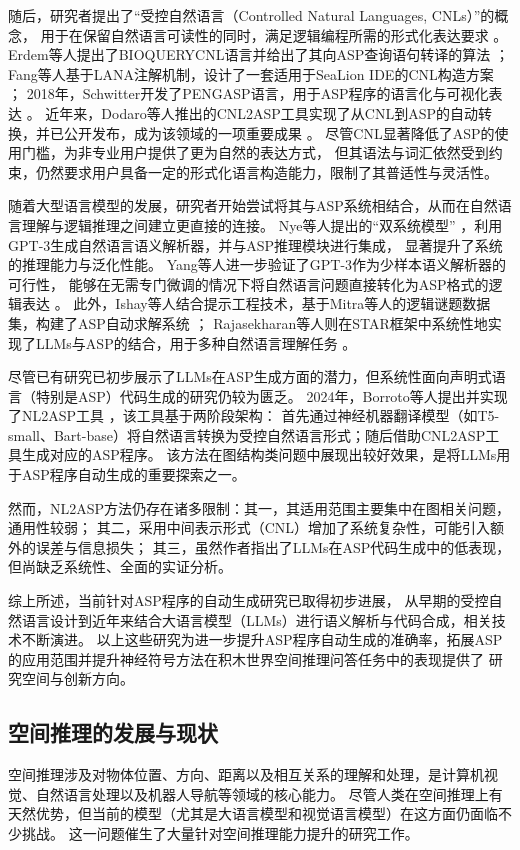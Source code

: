 随后，研究者提出了“受控自然语言（Controlled Natural Languages, CNLs）”的概念，
用于在保留自然语言可读性的同时，满足逻辑编程所需的形式化表达要求 \cite{kuhn2014survey}。
Erdem等人提出了BIOQUERYCNL语言并给出了其向ASP查询语句转译的算法 \cite{erdem2009transforming}；
Fang等人基于LANA注解机制，设计了一套适用于SeaLion IDE的CNL构造方案 \cite{fang2017approach}；
2018年，Schwitter开发了PENGASP语言，用于ASP程序的语言化与可视化表达 \cite{schwitter2018specifying}。
近年来，Dodaro等人推出的CNL2ASP工具实现了从CNL到ASP的自动转换，并已公开发布，成为该领域的一项重要成果 \cite{caruso2024cnl2asp}。
尽管CNL显著降低了ASP的使用门槛，为非专业用户提供了更为自然的表达方式，
但其语法与词汇依然受到约束，仍然要求用户具备一定的形式化语言构造能力，限制了其普适性与灵活性。

随着大型语言模型的发展，研究者开始尝试将其与ASP系统相结合，从而在自然语言理解与逻辑推理之间建立更直接的连接。
Nye等人提出的“双系统模型” \cite{nye2021improving}，利用GPT-3生成自然语言语义解析器，并与ASP推理模块进行集成，
显著提升了系统的推理能力与泛化性能。
Yang等人进一步验证了GPT-3作为少样本语义解析器的可行性，
能够在无需专门微调的情况下将自然语言问题直接转化为ASP格式的逻辑表达 \cite{yang2023coupling}。
此外，Ishay等人结合提示工程技术，基于Mitra等人的逻辑谜题数据集，构建了ASP自动求解系统 \cite{mitra2016addressing}；
Rajasekharan等人则在STAR框架中系统性地实现了LLMs与ASP的结合，用于多种自然语言理解任务 \cite{rajasekharan2023reliable}。

尽管已有研究已初步展示了LLMs在ASP生成方面的潜力，但系统性面向声明式语言（特别是ASP）代码生成的研究仍较为匮乏。
2024年，Borroto等人提出并实现了NL2ASP工具 \cite{borroto2024automaticcompositionaspprograms}，该工具基于两阶段架构：
首先通过神经机器翻译模型（如T5-small、Bart-base）将自然语言转换为受控自然语言形式；随后借助CNL2ASP工具生成对应的ASP程序。
该方法在图结构类问题中展现出较好效果，是将LLMs用于ASP程序自动生成的重要探索之一。

然而，NL2ASP方法仍存在诸多限制：其一，其适用范围主要集中在图相关问题，通用性较弱；
其二，采用中间表示形式（CNL）增加了系统复杂性，可能引入额外的误差与信息损失；
其三，虽然作者指出了LLMs在ASP代码生成中的低表现，但尚缺乏系统性、全面的实证分析。

综上所述，当前针对ASP程序的自动生成研究已取得初步进展，
从早期的受控自然语言设计到近年来结合大语言模型（LLMs）进行语义解析与代码合成，相关技术不断演进。
以上这些研究为进一步提升ASP程序自动生成的准确率，拓展ASP的应用范围并提升神经符号方法在积木世界空间推理问答任务中的表现提供了
研究空间与创新方向。
\subsection{空间推理的发展与现状}
空间推理涉及对物体位置、方向、距离以及相互关系的理解和处理，是计算机视觉、自然语言处理以及机器人导航等领域的核心能力。
尽管人类在空间推理上有天然优势，但当前的模型（尤其是大语言模型和视觉语言模型）在这方面仍面临不少挑战。
这一问题催生了大量针对空间推理能力提升的研究工作。

